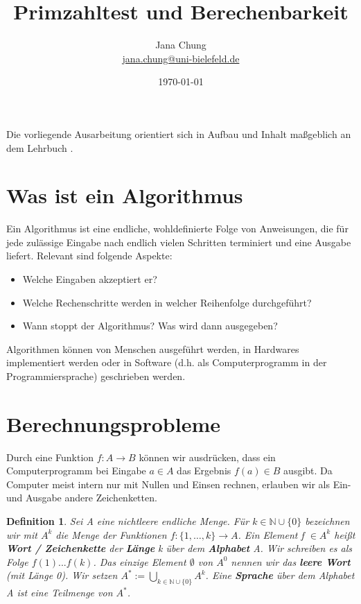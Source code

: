 \documentclass{article}
\newcommand{\N}{\mathbb{N}}%
\newtheorem{definition}[thm]{Definition} %
\begin{document}

\title{Primzahltest und Berechenbarkeit}
\date{\today} %
\author{Jana Chung\\ \url{jana.chung@uni-bielefeld.de}}


\maketitle

\begin{center}
      Die vorliegende Ausarbeitung orientiert sich in Aufbau und Inhalt 
maßgeblich an dem Lehrbuch \cite{Hougardy}. 
\end{center}
  

\section{Was ist ein Algorithmus}

Ein Algorithmus ist eine endliche, wohldefinierte Folge von Anweisungen, die für jede zulässige Eingabe nach endlich vielen Schritten terminiert und eine Ausgabe liefert. 
Relevant sind folgende Aspekte:
\begin{itemize}
    \item Welche Eingaben akzeptiert er?
    \item Welche Rechenschritte werden in welcher Reihenfolge durchgeführt?
    \item Wann stoppt der Algorithmus? Was wird dann ausgegeben?
\end{itemize}

Algorithmen können von Menschen ausgeführt werden, in Hardwares implementiert werden oder in Software (d.h. als Computerprogramm in der Programmiersprache) geschrieben werden.


\section{Berechnungsprobleme}

Durch eine Funktion $f\colon A \to B$  können wir ausdrücken, dass ein Computerprogramm bei Eingabe \(a \in A\) das Ergebnis \(f(a) \in B\) ausgibt. Da Computer meist intern nur mit Nullen und Einsen rechnen, erlauben wir als Ein- und Ausgabe andere Zeichenketten.

\begin{definition}   
Sei A eine nichtleere endliche Menge. Für $k \in \N \cup \{0\}$ bezeichnen wir mit $A^k$ die Menge der Funktionen $f: \{1,\dots,k\} \rightarrow A$.
Ein Element f $\in A^k$ heißt \textbf{Wort / Zeichenkette} der \textbf{Länge} k über dem \textbf{Alphabet} A. Wir schreiben es als Folge $f(1)... f(k)$.  
Das einzige Element $\emptyset$ von $A^0$ nennen wir das \textbf{leere Wort} (mit Länge 0). Wir setzen $A^\ast:= \bigcup_{k\in \N \cup \{0\}}^{} A^k$.
Eine \textbf{Sprache} über dem Alphabet A ist eine Teilmenge von $A^\ast$.
\end{definition}
\end{document}
